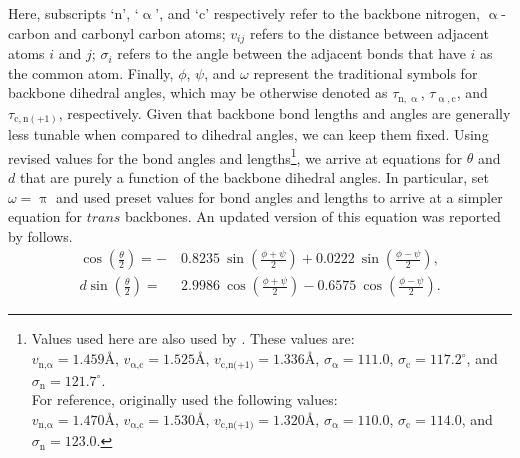 \documentclass[fleqn,10pt]{wlpeerj} %
\begin{document}
Here, subscripts `$\textrm{n}$', `$\upalpha$', and `$\textrm{c}$' respectively refer to the backbone nitrogen, $\upalpha$-carbon and carbonyl carbon atoms; $v_{ij}$ refers to the distance between adjacent atoms $i$ and $j$; $\sigma_i$ refers to the angle between the adjacent bonds that have $i$ as the common atom. Finally, $\phi$, $\psi$, and $\omega$ represent the traditional  symbols for backbone dihedral angles, which may be otherwise denoted as $\tau_{\textrm{n},\upalpha}$, $\tau_{\upalpha,\textrm{c}}$, and $\tau_{\textrm{c},\textrm{n}(+1)}$, respectively. Given that backbone bond lengths and angles are generally less tunable when compared to dihedral angles, we can keep them fixed. Using revised values for the bond angles and lengths\footnote{Values used here are also used by \cite{Zacharias2013}. These values are: \\%
$v_{\textrm{n,}\upalpha} = 1.459\textrm{\AA}$,\hfill
$v_{\upalpha\textrm{,c}} = 1.525\textrm{\AA}$, \hfill
$v_\textrm{c,n(+1)} = 1.336\textrm{\AA}$, \hfill
$\sigma_\upalpha = 111.0$,\hfill
$\sigma_\textrm{c} = 117.2^\circ$, \hfill and \hfill
$\sigma_\textrm{n} = 121.7^\circ$. \hfill \\
For reference, \cite{Miyazawa1961} originally used the following values:\\ 
$v_{\textrm{n,}\upalpha} = 1.470\textrm{\AA}$,\hfill
$v_{\upalpha\textrm{,c}} = 1.530\textrm{\AA}$,\hfill 
$v_\textrm{c,n(+1)} = 1.320\textrm{\AA}$, \hfill
$\sigma_\upalpha = 110.0$,\hfill
$\sigma_\textrm{c} = 114.0$, \hfill and \hfill
$\sigma_\textrm{n} = 123.0$.}, 
we arrive at equations for $\theta$ and $d$ that are purely a function of the backbone dihedral angles. In particular, \cite{Miyazawa1961} set $\omega=\uppi$ and used preset values for bond angles and lengths to arrive at a simpler equation for $trans$ backbones. An updated version of this equation was reported by \cite{Zacharias2013} follows.
\begin{align}
\label{eqn:theta_trans}
\cos\left(\frac{\theta}{2}\right) =-&~0.8235~\sin\left(\frac{\phi+\psi}{2}\right) 
                                    +0.0222~\sin\left(\frac{\phi-\psi}{2}\right),\\
\label{eqn:d_trans}
d \sin\left(\frac{\theta}{2}\right) =&~2.9986~\cos\left(\frac{\phi+\psi}{2}\right)
                                      -0.6575~\cos\left(\frac{\phi-\psi}{2}\right).
\end{align}
\end{document}
